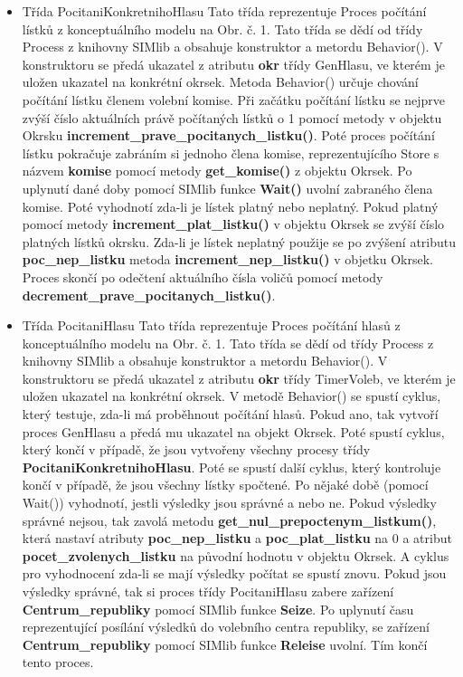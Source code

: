 \documentclass[12pt,a4paper,titlepage,final]{article}
\begin{document}
\begin{itemize}
\item Třída PocitaniKonkretnihoHlasu
\subitem Tato třída reprezentuje Proces počítání lístků z konceptuálního modelu na Obr. č. 1. Tato třída se dědí od třídy Process z knihovny SIMlib a obsahuje konstruktor a metordu Behavior(). V konstruktoru se předá ukazatel z atributu \textbf{okr} třídy GenHlasu, ve kterém je uložen ukazatel na konkrétní okrsek. Metoda Behavior() určuje chování počítání lístku členem volební komise. Při začátku počítání lístku se nejprve zvýší číslo aktuálních právě počítaných lístků o 1 pomocí metody v objektu Okrsku \textbf{increment\_prave\_pocitanych\_listku()}. Poté proces počítání lístku pokračuje zabráním si jednoho člena komise, reprezentujícího Store s názvem \textbf{komise} pomocí metody \textbf{get\_komise()} z objektu Okrsek. Po uplynutí dané doby pomocí SIMlib funkce \textbf{Wait()} uvolní zabraného člena komise. Poté vyhodnotí zda-li je lístek platný nebo neplatný. Pokud platný pomocí metody \textbf{increment\_plat\_listku()} v objektu Okrsek se zvýší číslo platných lístků okrsku. Zda-li je lístek neplatný použije se po zvýšení atributu \textbf{poc\_nep\_listku} metoda \textbf{increment\_nep\_listku()} v objetku Okrsek. Proces skončí po odečtení aktuálního čísla voličů pomocí metody \textbf{decrement\_prave\_pocitanych\_listku()}.

\item Třída PocitaniHlasu
\subitem Tato třída reprezentuje Proces počítání hlasů z konceptuálního modelu na Obr. č. 1. Tato třída se dědí od třídy Process z knihovny SIMlib a obsahuje konstruktor a metordu Behavior(). V konstruktoru se předá ukazatel z atributu \textbf{okr} třídy TimerVoleb, ve kterém je uložen ukazatel na konkrétní okrsek. V metodě Behavior() se spustí cyklus, který testuje, zda-li má proběhnout počítání hlasů. Pokud ano, tak vytvoří proces GenHlasu a předá mu ukazatel na objekt Okrsek. Poté spustí cyklus, který končí v případě, že jsou vytvořeny všechny procesy třídy \textbf{PocitaniKonkretnihoHlasu}. Poté se spustí další cyklus, který kontroluje končí v případě, že jsou všechny lístky spočtené. Po nějaké době (pomocí Wait()) vyhodnotí, jestli výsledky jsou správné a nebo ne. Pokud výsledky správné nejsou, tak zavolá metodu \textbf{get\_nul\_prepoctenym\_listkum()}, která nastaví atributy \textbf{poc\_nep\_listku} a \textbf{poc\_plat\_listku} na 0 a atribut \textbf{pocet\_zvolenych\_listku} na původní hodnotu v objektu Okrsek. A cyklus pro vyhodnocení zda-li se mají výsledky počítat se spustí znovu. Pokud jsou výsledky správné, tak si proces třídy PocitaniHlasu zabere zařízení \textbf{Centrum\_republiky} pomocí SIMlib funkce \textbf{Seize}. Po uplynutí času reprezentující posílání výsledků do volebního centra republiky, se zařízení \textbf{Centrum\_republiky} pomocí SIMlib funkce \textbf{Releise} uvolní. Tím končí tento proces.

\end{itemize}
\end{document}

